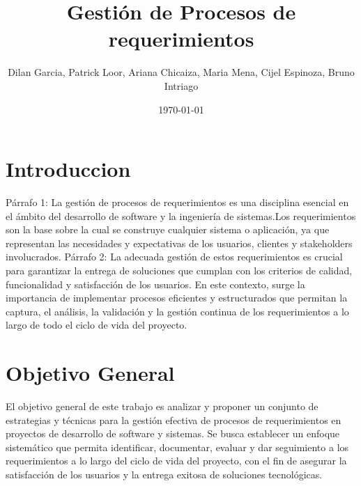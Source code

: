\documentclass[11pt]{article}
\title{ Gestión de Procesos de requerimientos}
\author{ Dilan Garcia, Patrick Loor, Ariana Chicaiza, Maria Mena, Cijel Espinoza, Bruno Intriago }
\date{\today}
\begin{document}
\maketitle	
\section{Introduccion}

Párrafo 1: La gestión de procesos de requerimientos es una disciplina esencial en el ámbito del desarrollo de software y la ingeniería de sistemas.Los requerimientos son la base sobre la cual se construye cualquier sistema o aplicación, ya que representan las necesidades y expectativas de los usuarios, clientes y stakeholders involucrados.
Párrafo 2: La adecuada gestión de estos requerimientos es crucial para garantizar la entrega de soluciones que cumplan con los criterios de calidad, funcionalidad y satisfacción de los usuarios. En este contexto, surge la importancia de implementar procesos eficientes y estructurados que permitan la captura, el análisis, la validación y la gestión continua de los requerimientos a lo largo de todo el ciclo de vida del proyecto.
\section{Objetivo General}

El objetivo general de este trabajo es analizar y proponer un conjunto de estrategias y técnicas para la gestión efectiva de procesos de requerimientos en proyectos de desarrollo de software y sistemas. Se busca establecer un enfoque sistemático que permita identificar, documentar, evaluar y dar seguimiento a los requerimientos a lo largo del ciclo de vida del proyecto, con el fin de asegurar la satisfacción de los usuarios y la entrega exitosa de soluciones tecnológicas.
\end{document}
